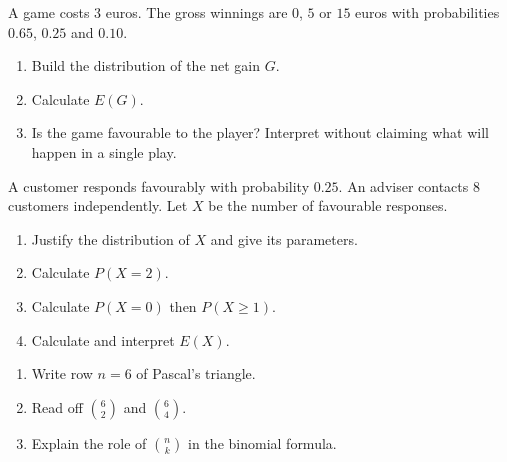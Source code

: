 \begin{exercice}
A game costs $3$ euros. The gross winnings are $0$, $5$ or $15$ euros with probabilities $0.65$, $0.25$ and $0.10$.
\begin{enumerate}
\item Build the distribution of the net gain $G$.
\item Calculate $E(G)$.
\item Is the game favourable to the player? Interpret without claiming what will happen in a single play.
\end{enumerate}
\end{exercice}
\begin{exercice}
A customer responds favourably with probability $0.25$. An adviser contacts $8$ customers independently. Let $X$ be the number of favourable responses.
\begin{enumerate}
\item Justify the distribution of $X$ and give its parameters.
\item Calculate $P(X=2)$.
\item Calculate $P(X=0)$ then $P(X\geq1)$.
\item Calculate and interpret $E(X)$.
\end{enumerate}
\end{exercice}
\begin{exercice}
\begin{enumerate}
\item Write row $n=6$ of Pascal's triangle.
\item Read off $\binom62$ and $\binom64$.
\item Explain the role of $\binom nk$ in the binomial formula.
\end{enumerate}
\end{exercice}
